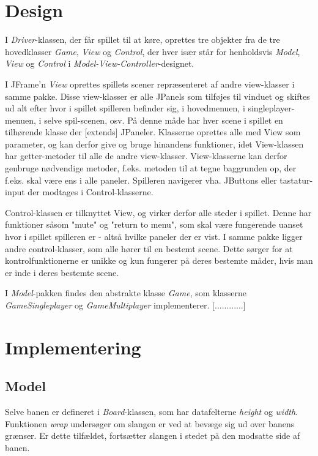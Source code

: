 \documentclass{report}
\begin{document}
\section{Design}
I \textit{Driver}-klassen, der får spillet til at køre, oprettes tre objekter fra de tre hovedklasser \textit{Game}, \textit{View} og \textit{Control}, der hver især står for henholdsvis \textit{Model}, \textit{View} og \textit{Control} i \textit{Model-View-Controller}-designet.

I JFrame'n \textit{View} oprettes spillets scener repræsenteret af andre view-klasser i samme pakke. Disse view-klasser er alle JPanels som tilføjes til vinduet og skiftes ud alt efter hvor i spillet spilleren befinder sig, i hovedmenuen, i singleplayer-menuen, i selve spil-scenen, osv. På denne måde har hver scene i spillet en tilhørende klasse der [extends] JPaneler. Klasserne oprettes alle med View som parameter, og kan derfor give og bruge hinandens funktioner, idet View-klassen har getter-metoder til alle de andre view-klasser. View-klasserne kan derfor genbruge nødvendige metoder, f.eks. metoden til at tegne baggrunden op, der f.eks. skal være ens i alle paneler. Spilleren navigerer vha. JButtons eller tastatur-input der modtages i Control-klasserne.

Control-klassen er tilknyttet View, og virker derfor alle steder i spillet. Denne har funktioner såsom "mute" og "return to menu", som skal være fungerende uanset hvor i spillet spilleren er - altså hvilke paneler der er vist. I samme pakke ligger andre control-klasser, som alle hører til en bestemt scene. Dette sørger for at kontrolfunktionerne er unikke og kun fungerer på deres bestemte måder, hvis man er inde i deres bestemte scene.

I \textit{Model}-pakken findes den abstrakte klasse \textit{Game}, som klasserne \textit{GameSingleplayer} og \textit{GameMultiplayer} implementerer. [............]


\section{Implementering}

\subsection{Model}
Selve banen er defineret i \textit{Board}-klassen, som har datafelterne \textit{height} og \textit{width}. Funktionen \textit{wrap} undersøger om slangen er ved at bevæge sig ud over banens grænser. Er dette tilfældet, fortsætter slangen i stedet på den modsatte side af banen.
\end{document}
